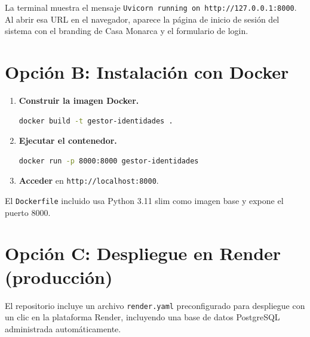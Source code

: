 \documentclass[10pt,letterpaper]{report}
\begin{document}
\begin{successbox}
  La terminal muestra el mensaje \texttt{Uvicorn running on http://127.0.0.1:8000}. Al abrir esa URL en el navegador, aparece la página de inicio de sesión del sistema con el branding de Casa Monarca y el formulario de login.
\end{successbox}


\section{Opción B: Instalación con Docker}

\begin{enumerate}[leftmargin=2cm]
  \item \textbf{Construir la imagen Docker.}
  \begin{lstlisting}[language=bash]
docker build -t gestor-identidades .
  \end{lstlisting}

  \item \textbf{Ejecutar el contenedor.}
  \begin{lstlisting}[language=bash]
docker run -p 8000:8000 gestor-identidades
  \end{lstlisting}

  \item \textbf{Acceder} en \texttt{http://localhost:8000}.
\end{enumerate}

El \texttt{Dockerfile} incluido usa Python 3.11 slim como imagen base y expone el puerto 8000.

\section{Opción C: Despliegue en Render (producción)}

El repositorio incluye un archivo \texttt{render.yaml} preconfigurado para despliegue con un clic en la plataforma Render, incluyendo una base de datos PostgreSQL administrada automáticamente.
\end{document}
